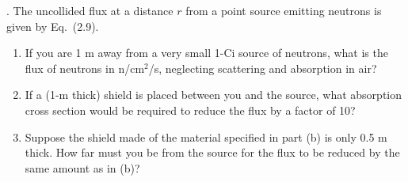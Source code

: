. The uncollided flux at a distance $r$ from a point source emitting neutrons is given by Eq.~(2.9).

\begin{enumerate}[label=(\alph*)]
\item If you are 1 m away from a very small 1-Ci source of neutrons, what is the flux of neutrons in n/cm$^2$/s, neglecting scattering and absorption in air?
\item If a (1-m thick) shield is placed between you and the source, what absorption cross section would be required to reduce the flux by a factor of 10?
\item Suppose the shield made of the material specified in part (b) is only 0.5 m thick.  How far must you be from the source for the flux to be reduced by the same amount as in (b)?
\end{enumerate}


